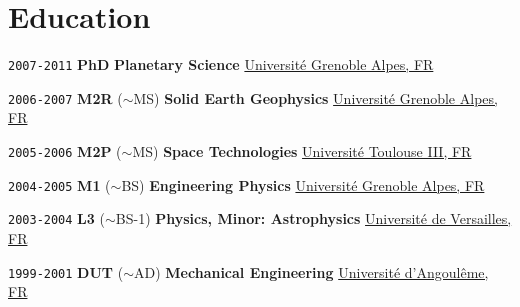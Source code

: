 \section*{Education}

\TabPositions{6em,9em,14em,30em}

\noindent \texttt{2007-2011}
\tab \textbf{PhD} 
\tab
\tab \textbf{Planetary Science} 
\tab \href{https://www.univ-grenoble-alpes.fr/}{Université Grenoble Alpes, FR}

\noindent \texttt{2006-2007}
\tab \textbf{M2R}
\tab ($\sim$MS)
\tab \textbf{Solid Earth Geophysics}
\tab \href{https://www.univ-grenoble-alpes.fr/}{Université Grenoble Alpes, FR}

\noindent \texttt{2005-2006}
\tab \textbf{M2P}
\tab ($\sim$MS)
\tab \textbf{Space Technologies}
\tab \href{https://www.univ-tlse3.fr/}{Université Toulouse III, FR}

\noindent \texttt{2004-2005}
\tab \textbf{M1}
\tab ($\sim$BS)
\tab \textbf{Engineering Physics}
\tab \href{https://www.univ-grenoble-alpes.fr/}{Université Grenoble Alpes, FR}

\noindent \texttt{2003-2004}
\tab \textbf{L3}
\tab ($\sim$BS-1)
\tab \textbf{Physics, Minor: Astrophysics}
\tab \href{http://www.sciences.uvsq.fr/}{Université de Versailles, FR}

\noindent \texttt{1999-2001}
\tab \textbf{DUT}
\tab ($\sim$AD)
\tab \textbf{Mechanical Engineering}
\tab \href{https://iut-angouleme.univ-poitiers.fr/}{Université d'Angoulême, FR}